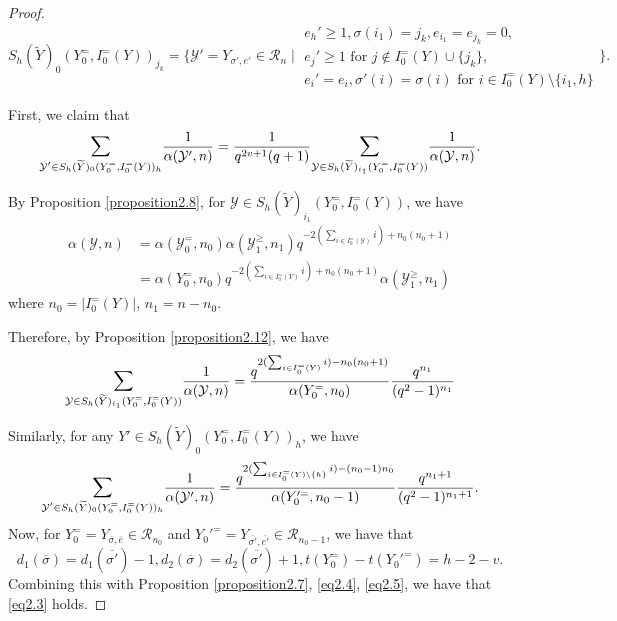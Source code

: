 \documentclass[11pt,oneside]{amsart}
\theoremstyle{plain}
\theoremstyle{definition}
\theoremstyle{remark}
\newcommand{\tx}[1]{\text{#1}}
\newcommand{\CR}{{\mathcal R}}
\newcommand{\CY}{{\mathcal Y}}
\numberwithin{equation}{section}
\begin{document}
\begin{proof}
		
		$		S_h(\widetilde{Y})_{0}(Y_0^=,I_0^=(Y))_{j_k}=\lbrace \CY'=Y_{\sigma',e'}\in \CR_n \mid \begin{array}{l}e_h'\geq1, \sigma(i_1)=j_k, e_{i_1}=e_{j_k}=0,\\
			e_j' \geq 1 \tx{ for }j \notin I_0^{=}(Y) \cup \lbrace j_k \rbrace, \\ e_i'=e_i, \sigma'(i)=\sigma(i) \tx{ for }i \in I_0^{=}(Y)\setminus \lbrace i_1,h \rbrace\end{array} \rbrace.
		$
		
		First, we claim that \begin{equation}\label{eq2.3}\mathlarger{\sum}_{\CY' \in 	S_h(\widetilde{Y})_{0}(Y_0^=,I_0^=(Y))_h} \dfrac{1}{\alpha(\CY',n)}=\dfrac{1}{q^{2v+1}(q+1)}\mathlarger{\sum}_{\CY \in S_h(\widetilde{Y})_{i_{1}}(Y_0^=,I_0^=(Y))} \dfrac{1}{\alpha(\CY,n)}.\end{equation}
		
		By Proposition \ref{proposition2.8}, for $\CY \in S_h(\widetilde{Y})_{i_{1}}(Y_0^=,I_0^=(Y))$, we have
		\begin{equation*}\begin{array}{ll}
				\alpha(\CY,n)&=\alpha(\CY_0^{=},n_0)\alpha(\CY_1^{\geq},n_1)q^{-2(\sum_{i \in I_0^{=}(\CY)} i)+n_0(n_0+1)}\\
				&=\alpha(Y_0^{=},n_0)q^{-2(\sum_{i \in I_0^{=}(Y)} i)+n_0(n_0+1)}\alpha(\CY_1^{\geq},n_1)
			\end{array}
		\end{equation*}
		where $n_0=\vert I_0^=(Y) \vert$, $n_1=n-n_0$.
		
		Therefore, by Proposition \ref{proposition2.12}, we have \begin{equation}\label{eq2.4}
			\mathlarger{\sum}_{\CY \in S_h(\widetilde{Y})_{i_{1}}(Y_0^=,I_0^=(Y))} \dfrac{1}{\alpha(\CY,n)}=\dfrac{q^{2(\sum_{i \in I_0^{=}(Y)} i)-n_0(n_0+1)}}{\alpha(Y_0^{=},n_0)}\dfrac{q^{n_1}}{(q^2-1)^{n_1}}
		\end{equation}
		
		Similarly, for any $Y' \in S_h(\widetilde{Y})_{0}(Y_0^=,I_0^=(Y))_h$, we have
		\begin{equation}\label{eq2.5}
			\mathlarger{\sum}_{\CY' \in 	S_h(\widetilde{Y})_{0}(Y_0^=,I_0^=(Y))_h} \dfrac{1}{\alpha(\CY',n)}=\dfrac{q^{2(\sum_{i \in I_0^{=}(Y) \setminus \lbrace h\rbrace} i)-(n_0-1)n_0}}{\alpha(Y_0'^{=},n_0-1)}\dfrac{q^{n_1+1}}{(q^2-1)^{n_1+1}}.
		\end{equation}
		Now, for $Y_0^==Y_{\overline{\sigma},\overline{e}} \in \CR_{n_0}$ and $Y_0'^==Y_{\overline{\sigma'},\overline{e'}} \in \CR_{n_0-1}$, we have that
		\begin{equation*}
			d_1(\overline{\sigma})=d_1({\overline{\sigma'}})-1, d_2({\overline{\sigma}})=d_2({\overline{\sigma'}})+1, t(Y_0^=)-t(Y_0'^=)=h-2-v.
		\end{equation*}
		Combining this with Proposition \ref{proposition2.7}, \eqref{eq2.4}, \eqref{eq2.5}, we have that \eqref{eq2.3} holds.
		

\end{proof}
\end{document}
